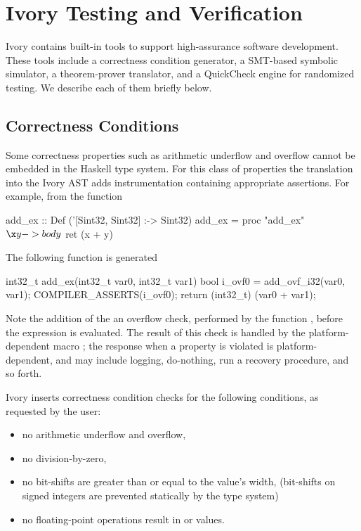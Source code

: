 \section{Ivory Testing and Verification}
\label{sec:tools}

Ivory contains built-in tools to support high-assurance software
development. These tools include a correctness condition generator, a
SMT-based symbolic simulator, a theorem-prover translator, and a
QuickCheck\cite{qc} engine for randomized testing. We describe each of
them briefly below.


\subsection{Correctness Conditions}
Some correctness properties such as arithmetic underflow and overflow
cannot be embedded in the Haskell type system. For this class of
properties the translation into the Ivory AST adds instrumentation
containing appropriate assertions. For example, from the function

\begin{code}
add_ex :: Def ('[Sint32, Sint32] :-> Sint32)
add_ex = proc "add_ex" $ \x y -> body $
  ret (x + y)
\end{code}
\noindent
The following function is generated
\begin{code}
int32_t add_ex(int32_t var0, int32_t var1)
{
    bool i_ovf0 = add_ovf_i32(var0, var1);
    COMPILER_ASSERTS(i_ovf0);
    return (int32_t) (var0 + var1);
}
\end{code}
\noindent
Note the addition of the an overflow check, performed by the function
, before the expression is evaluated. The result of
this check is handled by the platform-dependent macro
; the response when a property is
violated is platform-dependent, and may include logging, do-nothing, run a
recovery procedure, and so forth.

Ivory inserts correctness condition checks for the following conditions, as requested by
the user:
\begin{itemize}
\item no arithmetic underflow and overflow,
\item no division-by-zero,
\item no bit-shifts are greater than or equal to the value's width,
  (bit-shifts on signed integers are prevented statically by the type system)
\item no floating-point operations result in  or  values.
\end{itemize}

